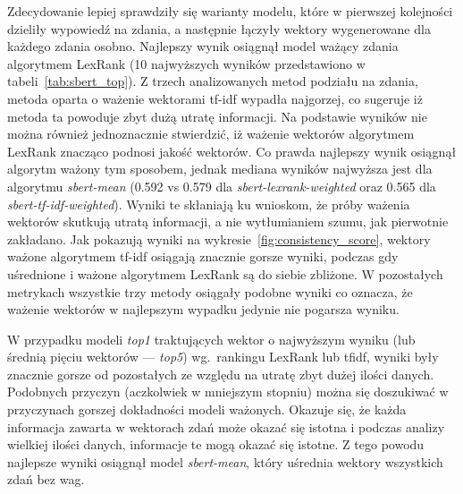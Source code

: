 		Zdecydowanie lepiej sprawdziły się warianty modelu, które w pierwszej kolejności dzieliły wypowiedź na zdania, a następnie łączyły wektory wygenerowane dla każdego zdania osobno.
		Najlepszy wynik osiągnął model ważący zdania algorytmem LexRank (10 najwyższych wyników przedstawiono w tabeli~\ref{tab:sbert_top}).
		Z trzech analizowanych metod podziału na zdania, metoda oparta o ważenie wektorami tf-idf wypadła najgorzej, co sugeruje iż metoda ta powoduje zbyt dużą utratę informacji.
		Na podstawie wyników nie można również jednoznacznie stwierdzić, iż ważenie wektorów algorytmem LexRank znacząco podnosi jakość wektorów.
		Co prawda najlepszy wynik osiągnął algorytm ważony tym sposobem,
			jednak mediana wyników najwyższa jest dla algorytmu \emph{sbert-mean} (0.592 vs 0.579 dla \emph{sbert-lexrank-weighted} oraz 0.565 dla \emph{sbert-tf-idf-weighted}).
		Wyniki te skłaniają ku wnioskom, że próby ważenia wektorów skutkują utratą informacji, a nie wytłumianiem szumu, jak pierwotnie zakładano.
		Jak pokazują wyniki na wykresie~\ref{fig:consistency_score}, wektory ważone algorytmem tf-idf osiągają znacznie gorsze wyniki,
			podczas gdy uśrednione i ważone algorytmem LexRank są do siebie zbliżone.
		W pozostałych metrykach wszystkie trzy metody osiągały podobne wyniki co oznacza, że ważenie wektorów w najlepszym wypadku jedynie nie pogarsza wyniku.
		
		W przypadku modeli \emph{top1} traktujących wektor o najwyższym wyniku (lub średnią pięciu wektorów --- \emph{top5}) wg.\ rankingu LexRank lub tfidf,
			wyniki były znacznie gorsze od pozostałych ze względu na utratę zbyt dużej ilości danych.
		Podobnych przyczyn (aczkolwiek w mniejszym stopniu) można się doszukiwać w przyczynach gorszej dokładności modeli ważonych.
		Okazuje się, że każda informacja zawarta w wektorach zdań może okazać się istotna i podczas analizy wielkiej ilości danych,
			informacje te mogą okazać się istotne.
		Z tego powodu najlepsze wyniki osiągnął model \emph{sbert-mean}, który uśrednia wektory wszystkich zdań bez wag.

